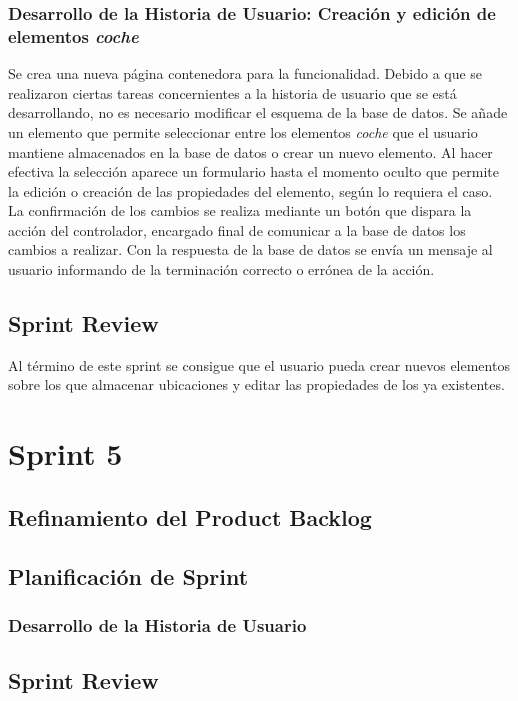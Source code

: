 	\subsubsection{Desarrollo de la Historia de Usuario: Creación y edición de elementos \textit{coche}}
	Se crea una nueva página contenedora para la funcionalidad. Debido a que se realizaron ciertas tareas concernientes a la historia de usuario que se está desarrollando, no es necesario modificar el esquema de la base de datos. Se añade un elemento que permite seleccionar entre los elementos \textit{coche} que el usuario mantiene almacenados en la base de datos o crear un nuevo elemento.
	Al hacer efectiva la selección aparece un formulario hasta el momento oculto que permite la edición o creación de las propiedades del elemento, según lo requiera el caso.
	La confirmación de los cambios se realiza mediante un botón que dispara la acción del controlador, encargado final de comunicar a la base de datos los cambios a realizar. Con la respuesta de la base de datos se envía un mensaje al usuario informando de la terminación correcto o errónea de la acción.
		
	\subsection{Sprint Review}
	Al término de este sprint se consigue que el usuario pueda crear nuevos elementos sobre los que almacenar ubicaciones y editar las propiedades de los ya existentes.

\section{Sprint 5}
	\subsection{Refinamiento del Product Backlog}
	
	\subsection{Planificación de Sprint}
	
	\subsubsection{Desarrollo de la Historia de Usuario }
			
	\subsection{Sprint Review}


